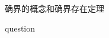 \documentclass{exam}
\begin{document}
\begin{center}
    \Large 确界的概念和确界存在定理
\end{center}

\begin{questions}
    \question
    question

\end{questions}
\end{document}
